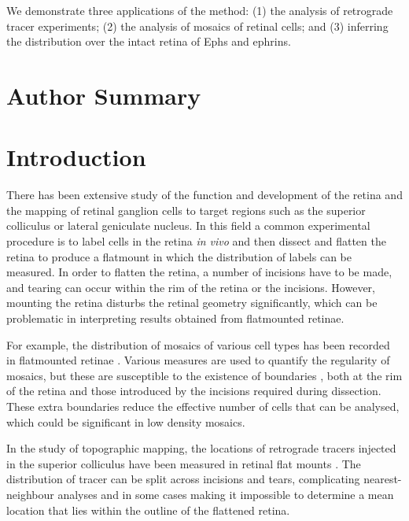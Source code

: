 \documentclass[10pt]{article}
\begin{document}
We demonstrate three applications of the method: (1) the analysis of
retrograde tracer experiments; (2) the analysis of mosaics of retinal
cells; and (3) inferring the distribution over the intact retina of
Ephs and ephrins.

\section*{Author Summary}

\section*{Introduction}

There has been extensive study of the function and development of the
retina and the mapping of retinal ganglion cells to target regions
such as the superior colliculus or lateral geniculate nucleus. In this
field a common experimental procedure is to label cells in the retina
\emph{in vivo} and then dissect and flatten the retina to produce a
flatmount in which the distribution of labels can be measured. In
order to flatten the retina, a number of incisions have to be made,
and tearing can occur within the rim of the retina or the incisions.
However, mounting the retina disturbs the retinal geometry
significantly, which can be problematic in interpreting results
obtained from flatmounted retinae.

For example, the distribution of mosaics of various cell types has
been recorded in flatmounted retinae
\cite{WassBoyc91func,RaveEtal03dete}.  Various measures are used to
quantify the regularity of mosaics, but these are susceptible to the
existence of boundaries \cite{Cook96spat}, both at the rim of the
retina and those introduced by the incisions required during
dissection. These extra boundaries reduce the effective number of
cells that can be analysed, which could be significant in low density
mosaics.

In the study of topographic mapping, the locations of retrograde
tracers injected in the superior colliculus have been measured in
retinal flat mounts \cite{RebeEtal04rela,RashEtal05oppo}. The
distribution of tracer can be split across incisions and tears,
complicating nearest-neighbour analyses and in some cases making it
impossible to determine a mean location that lies within the outline
of the flattened retina.
\end{document}
